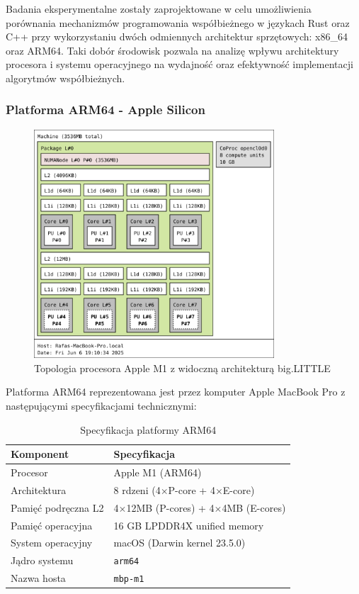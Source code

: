 Badania eksperymentalne zostały zaprojektowane w celu umożliwienia porównania mechanizmów programowania współbieżnego w językach Rust oraz C++ przy wykorzystaniu dwóch odmiennych architektur sprzętowych: x86\_64 oraz ARM64. Taki dobór środowisk pozwala na analizę wpływu architektury procesora i systemu operacyjnego na wydajność oraz efektywność implementacji algorytmów współbieżnych.

\subsubsection{Platforma ARM64 - Apple Silicon}

\begin{figure}[H]
\centering
\includegraphics[width=0.8\textwidth]{images/arm.png}
\caption{Topologia procesora Apple M1 z widoczną architekturą big.LITTLE}
\label{fig:m1_topology}
\end{figure}

Platforma ARM64 reprezentowana jest przez komputer Apple MacBook Pro z następującymi specyfikacjami technicznymi:

\begin{table}[h]
\centering
\caption{Specyfikacja platformy ARM64}
\begin{tabular}{|l|l|}
\hline
\textbf{Komponent} & \textbf{Specyfikacja} \\
\hline
Procesor & Apple M1 (ARM64) \\
Architektura & 8 rdzeni (4$\times$P-core + 4$\times$E-core) \\
Pamięć podręczna L2 & 4$\times$12MB (P-cores) + 4$\times$4MB (E-cores) \\
Pamięć operacyjna & 16 GB LPDDR4X unified memory \\
System operacyjny & macOS (Darwin kernel 23.5.0) \\
Jądro systemu & \texttt{arm64} \\
Nazwa hosta & \texttt{mbp-m1} \\
\hline
\end{tabular}

\label{tab:arm64_specs}
\end{table}

